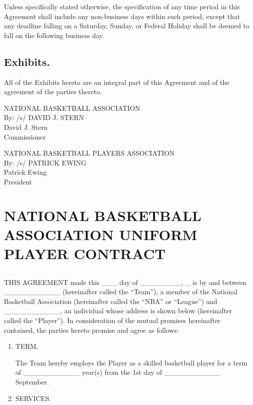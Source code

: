 \documentclass[
]{book}
\begin{document}
Unless specifically stated otherwise, the specification of any time period in this Agreement shall include any non-business days within such period, except that any deadline falling on a Saturday, Sunday, or Federal Holiday shall be deemed to fall on the following business day.

\hypertarget{exhibits.}{%
\section{Exhibits.}\label{exhibits.}}

All of the Exhibits hereto are an integral part of this Agreement and of the agreement of the parties thereto.

NATIONAL BASKETBALL ASSOCIATION\\
By: /s/ DAVID J. STERN\\
David J. Stern\\
Commissioner

NATIONAL BASKETBALL PLAYERS ASSOCIATION\\
By: /s/ PATRICK EWING\\
Patrick Ewing\\
President

\hypertarget{appendix-appendix}{%
\appendix}


\hypertarget{national-basketball-association-uniform-player-contract}{%
\chapter{NATIONAL BASKETBALL ASSOCIATION UNIFORM PLAYER CONTRACT}\label{national-basketball-association-uniform-player-contract}}

\hypertarget{section}{%
\section{}\label{section}}

THIS AGREEMENT made this \_\_\_ day of \_\_\_\_\_\_\_\_, \_ is by and between \_\_\_\_\_\_\_\_\_\_\_ (hereinafter called the ``Team''), a member of the National Basketball Association (hereinafter called the ``NBA'' or ``League'') and \_\_\_\_\_\_\_\_\_\_\_, an individual whose address is shown below (hereinafter called the ``Player''). In consideration of the mutual promises hereinafter contained, the parties hereto promise and agree as follows:

\begin{enumerate}
\def\labelenumi{\arabic{enumi}.}
\item
  TERM.

  The Team hereby employs the Player as a skilled basketball player for a term of \_\_\_\_\_\_\_\_\_\_\_ year(s) from the 1st day of \_\_\_\_\_\_\_\_\_\_\_ September.
\item
  SERVICES.
\end{enumerate}
\end{document}
